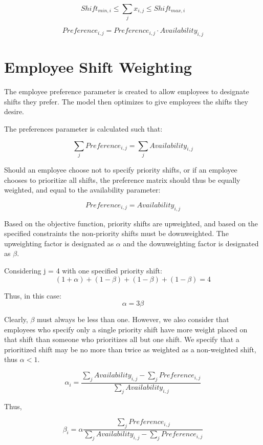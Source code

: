$$ \begin{equation}\label{employeeshifts} Shift_{min,i}\le \sum\limits_{j}x_{i,j} \le Shift_{max,i} \end{equation}$$


$$ \begin{equation}\label{preference} Preference_{i,j} =   Preference_{i,j} \cdot Availability_{i,j} \end{equation}$$


\section{Employee Shift Weighting}
The employee preference parameter is created to allow employees to designate shifts they prefer. The model then optimizes to give employees the shifts they desire. 

The preferences parameter is calculated such that:

$$\sum\limits_{j}Preference_{i,j} = \sum\limits_{j}Availability_{i,j}$$

Should an employee choose not to specify priority shifts, or if an employee chooses to prioritize all shifts, the preference matrix should thus be equally weighted, and equal to the availability parameter:

$$Preference_{i,j} = Availability_{i,j}$$

Based on the objective function, priority shifts are upweighted, and based on the specified constraints the non-priority shifts must be downweighted. The upweighting factor is designated as $\alpha$ and the downweighting factor is designated as $\beta$. 

Considering j = 4 with one specified priority shift:
$$ (1 + \alpha) + (1-\beta) + (1-\beta) + (1-\beta) = 4 $$

Thus,  in this case: $$\alpha = 3\beta$$

Clearly, $\beta$ must always be less than one. However, we also consider that employees who specify only a single priority shift have more weight placed on that shift than someone who prioritizes all but one shift.  We specify that a prioritized shift may be no more than twice as weighted as a non-weighted shift, thus $\alpha<1$.

$$\alpha_{i} = \frac{\sum\limits_{j}Availability_{i,j} - \sum\limits_{j}Preference_{i,j}}{\sum\limits_{j}Availability_{i,j}}$$

Thus,

$$\beta_{i} = \alpha \frac{\sum\limits_{j}Preference_{i,j}}{\sum\limits_{j}Availability_{i,j} - \sum\limits_{j}Preference_{i,j}}$$

